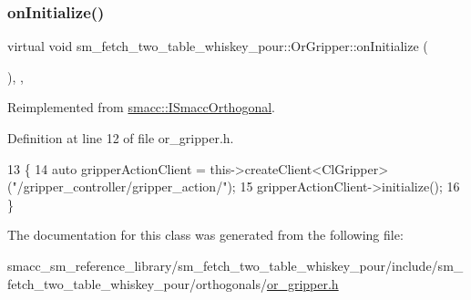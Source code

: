 \subsubsection{\texorpdfstring{on\+Initialize()}{onInitialize()}}
{\footnotesize\ttfamily virtual void sm\+\_\+fetch\+\_\+two\+\_\+table\+\_\+whiskey\+\_\+pour\+::\+Or\+Gripper\+::on\+Initialize (\begin{DoxyParamCaption}{ }\end{DoxyParamCaption})\hspace{0.3cm}{\ttfamily [inline]}, {\ttfamily [override]}, {\ttfamily [virtual]}}



Reimplemented from \hyperlink{classsmacc_1_1ISmaccOrthogonal_a6bb31c620cb64dd7b8417f8705c79c7a}{smacc\+::\+I\+Smacc\+Orthogonal}.



Definition at line 12 of file or\+\_\+gripper.\+h.


\begin{DoxyCode}
13     \{
14         \textcolor{keyword}{auto} gripperActionClient = this->createClient<ClGripper>(\textcolor{stringliteral}{"/gripper\_controller/gripper\_action/"});
15         gripperActionClient->initialize();
16     \}
\end{DoxyCode}


The documentation for this class was generated from the following file\+:\begin{DoxyCompactItemize}
\item 
smacc\+\_\+sm\+\_\+reference\+\_\+library/sm\+\_\+fetch\+\_\+two\+\_\+table\+\_\+whiskey\+\_\+pour/include/sm\+\_\+fetch\+\_\+two\+\_\+table\+\_\+whiskey\+\_\+pour/orthogonals/\hyperlink{sm__fetch__two__table__whiskey__pour_2include_2sm__fetch__two__table__whiskey__pour_2orthogonals_2or__gripper_8h}{or\+\_\+gripper.\+h}\end{DoxyCompactItemize}
